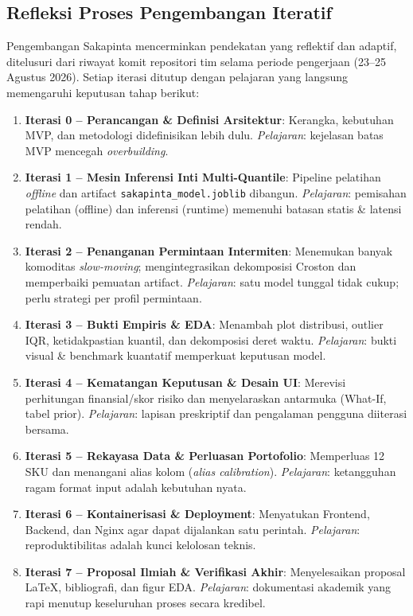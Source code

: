 \documentclass[12pt,a4paper]{article}
\begin{document}
\subsection{Refleksi Proses Pengembangan Iteratif}
Pengembangan Sakapinta mencerminkan pendekatan yang reflektif dan adaptif, ditelusuri dari riwayat komit repositori tim selama periode pengerjaan (23--25 Agustus 2026). Setiap iterasi ditutup dengan pelajaran yang langsung memengaruhi keputusan tahap berikut:
\begin{enumerate}
    \item \textbf{Iterasi 0 -- Perancangan \& Definisi Arsitektur}: Kerangka, kebutuhan MVP, dan metodologi didefinisikan lebih dulu. \textit{Pelajaran}: kejelasan batas MVP mencegah \textit{overbuilding}.
    \item \textbf{Iterasi 1 -- Mesin Inferensi Inti Multi-Quantile}: Pipeline pelatihan \textit{offline} dan artifact \texttt{sakapinta\_model.joblib} dibangun. \textit{Pelajaran}: pemisahan pelatihan (offline) dan inferensi (runtime) memenuhi batasan statis \& latensi rendah.
    \item \textbf{Iterasi 2 -- Penanganan Permintaan Intermiten}: Menemukan banyak komoditas \textit{slow-moving}; mengintegrasikan dekomposisi Croston dan memperbaiki pemuatan artifact. \textit{Pelajaran}: satu model tunggal tidak cukup; perlu strategi per profil permintaan.
    \item \textbf{Iterasi 3 -- Bukti Empiris \& EDA}: Menambah plot distribusi, outlier IQR, ketidakpastian kuantil, dan dekomposisi deret waktu. \textit{Pelajaran}: bukti visual \& benchmark kuantatif memperkuat keputusan model.
    \item \textbf{Iterasi 4 -- Kematangan Keputusan \& Desain UI}: Merevisi perhitungan finansial/skor risiko dan menyelaraskan antarmuka (What-If, tabel prior). \textit{Pelajaran}: lapisan preskriptif dan pengalaman pengguna diiterasi bersama.
    \item \textbf{Iterasi 5 -- Rekayasa Data \& Perluasan Portofolio}: Memperluas 12 SKU dan menangani alias kolom (\textit{alias calibration}). \textit{Pelajaran}: ketangguhan ragam format input adalah kebutuhan nyata.
    \item \textbf{Iterasi 6 -- Kontainerisasi \& Deployment}: Menyatukan Frontend, Backend, dan Nginx agar dapat dijalankan satu perintah. \textit{Pelajaran}: reproduktibilitas adalah kunci kelolosan teknis.
    \item \textbf{Iterasi 7 -- Proposal Ilmiah \& Verifikasi Akhir}: Menyelesaikan proposal LaTeX, bibliografi, dan figur EDA. \textit{Pelajaran}: dokumentasi akademik yang rapi menutup keseluruhan proses secara kredibel.
\end{enumerate}
\end{document}
